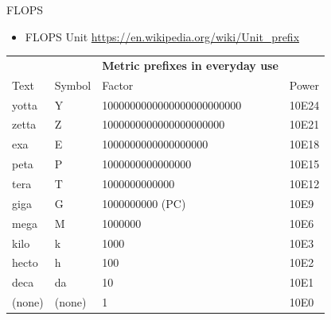 \documentclass[ignorenonframetext,]{beamer}
\providecommand{\tightlist}{%
  \setlength{\itemsep}{0pt}\setlength{\parskip}{0pt}}
\begin{document}
\begin{frame}{FLOPS}

\begin{itemize}
\tightlist
\item
  FLOPS Unit \url{https://en.wikipedia.org/wiki/Unit_prefix}
\end{itemize}


\begin{longtable}[]{@{}llll@{}}
\toprule
\endhead
& & \textbf{Metric prefixes in everyday use} &\tabularnewline
Text & Symbol & Factor & Power\tabularnewline
yotta & Y & 1000000000000000000000000 & 10E24\tabularnewline
zetta & Z & 1000000000000000000000 & 10E21\tabularnewline
exa & E & 1000000000000000000 & 10E18\tabularnewline
peta & P & 1000000000000000 & 10E15\tabularnewline
tera & T & 1000000000000 & 10E12\tabularnewline
giga & G & 1000000000 (PC) & 10E9\tabularnewline
mega & M & 1000000 & 10E6\tabularnewline
kilo & k & 1000 & 10E3\tabularnewline
hecto & h & 100 & 10E2\tabularnewline
deca & da & 10 & 10E1\tabularnewline
(none) & (none) & 1 & 10E0\tabularnewline
\bottomrule
\end{longtable}

\end{frame}
\end{document}
